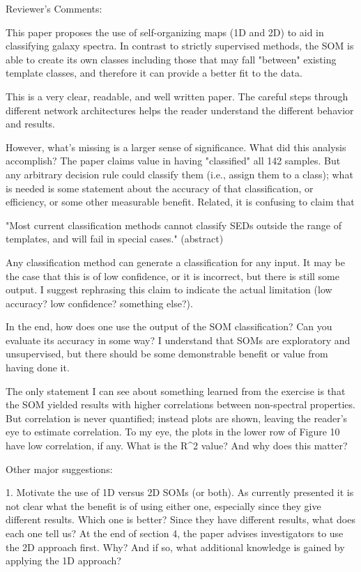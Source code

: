 Reviewer's Comments:

This paper proposes the use of self-organizing maps (1D and 2D) to aid in classifying galaxy spectra.  In contrast to strictly supervised methods, the SOM is able to create its own classes including those that may fall "between" existing template classes, and therefore it can provide a better fit to the data.

This is a very clear, readable, and well written paper.  The careful steps through different network architectures helps the reader understand the different behavior and results.

However, what's missing is a larger sense of significance.  What did this analysis accomplish?  The paper claims value in having "classified" all 142 samples.  But any arbitrary decision rule could classify them (i.e., assign them to a class); what is needed is some statement about the accuracy of that classification, or efficiency, or some other measurable benefit.  Related, it is confusing to claim that

"Most current classification methods cannot classify SEDs outside the range of templates, and will fail in special cases." (abstract)

Any classification method can generate a classification for any input.  It may be the case that this is of low confidence, or it is incorrect, but there is still some output.  I suggest rephrasing this claim to indicate the actual limitation (low accuracy? low confidence? something else?).

In the end, how does one use the output of the SOM classification? Can you evaluate its accuracy in some way?  I understand that SOMs are exploratory and unsupervised, but there should be some demonstrable benefit or value from having done it.

The only statement I can see about something learned from the exercise is that the SOM yielded results with higher correlations between non-spectral properties.  But correlation is never quantified; instead plots are shown, leaving the reader's eye to estimate correlation.  To my eye, the plots in the lower row of Figure 10 have low correlation, if any.  What is the R^2 value?  And why does this matter?

Other major suggestions:

1. Motivate the use of 1D versus 2D SOMs (or both).  As currently presented it is not clear what the benefit is of using either one, especially since they give different results.  Which one is better? Since they have different results, what does each one tell us?  At the end of section 4, the paper advises investigators to use the 2D approach first.  Why?  And if so, what additional knowledge is gained by applying the 1D approach?

